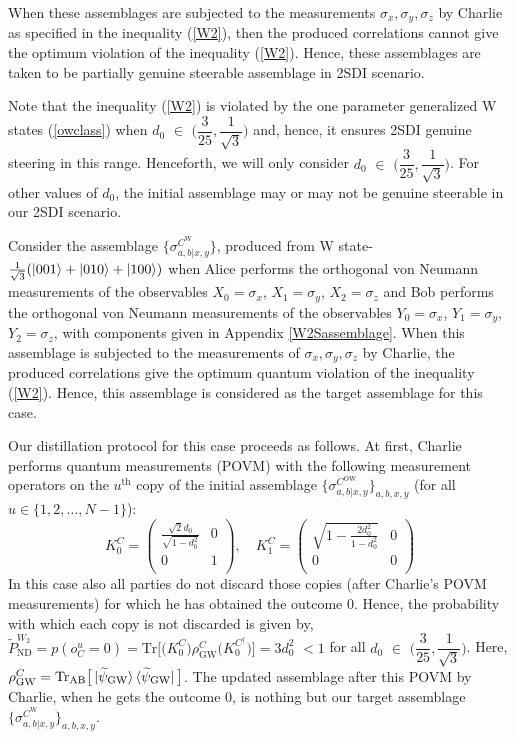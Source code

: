 \documentclass[reprint,superscriptaddress,nofootinbib,amsmath,amssymb,aps,pra,longbibliography]{revtex4-1}
\begin{document}
When these assemblages are subjected to the measurements $ \sigma_x,  \sigma_y,  \sigma_z$ by Charlie as specified in the inequality (\ref{W2}), then the produced correlations cannot give the optimum violation of the inequality (\ref{W2}). Hence,  these assemblages are taken to be partially genuine steerable assemblage in 2SDI scenario.


Note that the inequality (\ref{W2}) is violated by the one parameter generalized W states (\ref{owclass}) when $d_0$ $\in$ $\Bigg( \dfrac{3}{25}, \dfrac{1}{\sqrt{3}} \Bigg)$ and, hence, it ensures 2SDI genuine steering in this range. Henceforth, we will only consider $d_0$ $\in$ $\Bigg( \dfrac{3}{25}, \dfrac{1}{\sqrt{3}} \Bigg)$. For other values of $d_0$, the initial assemblage may or may not be genuine steerable in our 2SDI scenario.


Consider the assemblage $\{\sigma_{a,b|x,y}^{C^{\text{W}}} \}$, produced from W state- $\frac{1}{\sqrt{3}}(\ket{001}+\ket{010}+\ket{100})$ when Alice performs the  orthogonal von Neumann measurements of the observables $X_0=\sigma_x$,  $X_1=\sigma_y$,  $X_2=\sigma_z$ and Bob performs the  orthogonal von Neumann measurements of the observables $Y_0=\sigma_x$,  $Y_1=\sigma_y$,  $Y_2=\sigma_z$, with components given in Appendix \ref{W2Sassemblage}. When this assemblage is subjected to the  measurements of $ \sigma_x,  \sigma_y,  \sigma_z$ by Charlie,  the produced correlations give the optimum quantum violation of the inequality (\ref{W2}). Hence,  this assemblage is considered as the target assemblage for this case.
    
Our distillation protocol for this case proceeds as follows. At first, Charlie performs quantum measurements (POVM) with the following measurement operators on the $u^{\text{th}}$ copy of the initial assemblage $\{\sigma_{a,b|x,y}^{C^{\text{OW}}} \}_{a,b,x,y}$ (for all $u \in \{1, 2, . . . , N-1\}$):
\begin{equation}
	K_0^C = \left(
\begin{array}{cc}
 \frac{\sqrt{2} d_0}{\sqrt{1-d_0^2}} & 0 \\
 0 & 1 \\
\end{array}
\right), \quad K_1^C = \left(
\begin{array}{cc}
 \sqrt{1- \frac{2 d_0^2}{1-d_0^2}} & 0 \\
 0 & 0 \\
\end{array}
\right)
\label{POVM2SW}
\end{equation}
In this case also all parties do not discard those copies (after Charlie's POVM measurements) for which he has obtained the outcome $0$. Hence, the probability with which each copy is not discarded is given by, $\tilde{P}_{\text{ND}}^{W_2} = p(o_C^u = 0) = \text{Tr}\big[ \big(K_0^C\big)\rho_{\text{GW}}^C\big(K_0^{C^{\dagger}}\big)\big] = 3d_0^2$ $< 1$ for all $d_0$ $\in$ $\Bigg( \dfrac{3}{25}, \dfrac{1}{\sqrt{3}} \Bigg)$. Here, $\rho_{\text{GW}}^C = \text{Tr}_{\text{AB}} \big[\ket{\widetilde{\psi}_{\text{GW}}}\bra{\widetilde{\psi}_{\text{GW}}}\big]$. The updated assemblage after this POVM by Charlie, when he gets the outcome $0$, is nothing but our target assemblage $\{\sigma_{a,b|x,y}^{C^{\text{W}}}\}_{a,b,x,y}$. 
\end{document}
